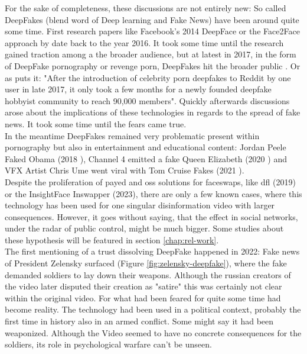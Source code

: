 \documentclass[
  a4paper,  %
  twoside,  %
  bibliography=totoc,
  headsepline,
  cleardoublepage=empty,
  parskip=half,
  draft=false
]{scrbook}
\begin{document}
For the sake of completeness, these discussions are not entirely new: So called DeepFakes (blend word of Deep learning and Fake News) have been around quite some time. First research papers like Facebook's 2014 DeepFace \cite{taigmanDeepFaceClosingGap2014} or the Face2Face approach by \citet{thiesFace2FaceRealtimeFace2020} date back to the year 2016. It took some time until the research gained traction among a the broader audience, but at latest in 2017, in the form of DeepFake pornography or revenge porn, DeepFakes hit the broader public \cite{coleAIAssistedFakePorn2017}. 
Or as \citet{westerlundEmergenceDeepfakeTechnology2019a} puts it: "After the introduction of celebrity porn deepfakes to Reddit by one user in late 2017, it only took a few months for a newly founded deepfake hobbyist community to reach 90,000 members".
Quickly afterwards discussions arose about the implications of these technologies in regards to the spread of fake news.
It took some time until the fears came true. \\
In the meantime DeepFakes remained very problematic present within pornography but also in entertainment and educational content: Jordan Peele Faked Obama (2018 \cite{vincentWatchJordanPeele2018}), Channel 4 emitted a fake Queen Elizabeth (2020 \cite{DeepfakeQueenDeliver2020}) and VFX Artist Chris Ume went viral with Tom Cruise Fakes (2021 \cite{vincentTomCruiseDeepfake2021}). \\
Despite the proliferation of payed and \gls{oss} solutions for faceswaps, like \gls{dfl} (2019) or the InsightFace Inswapper (2023), there are only a few known cases, where this technology has been used for one singular disinformation video with larger consequences. However, it goes without saying, that the effect in social networks, under the radar of public control, might be much bigger. Some studies about these hypothesis will be featured in section \ref{chap:rel-work}. \\
The first mentioning of a trust dissolving DeepFake happened in 2022: Fake news of President Zelensky surfaced (Figure \ref{fig:zelensky-deepfake}), where the fake demanded soldiers to lay down their weapons. Although the russian creators of the video later disputed their creation as "satire" this was certainly not clear within the original video. For what had been feared for quite some time had become reality. The technology had been used in a political context, probably the first time in history also in an armed conflict. Some might say it had been weaponized. Although the Video seemed to have no concrete consequences for the soldiers, its role in psychological warfare can't be unseen.
\end{document}
